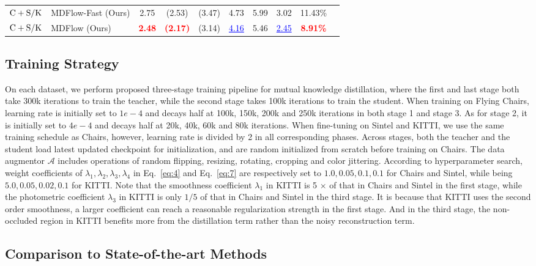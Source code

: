 \documentclass[lettersize,journal]{IEEEtran}
\begin{document}
\begin{table*}[t]
\begin{tabular}{llcccccccc}
		$\rm C+S/K$ & MDFlow-Fast (Ours) & 2.75 & (2.53) & (3.47) & 4.73 & 5.99 & 3.02 & 11.43\% \\
		$\rm C+S/K$ & MDFlow (Ours) & \textcolor{red}{\textbf{2.48}} & \textcolor{red}{\textbf{(2.17)}} & (3.14) & \textcolor{blue}{\underline{4.16}} & 5.46 & \textcolor{blue}{\underline{2.45}} & \textcolor{red}{\textbf{8.91\%}} \\
		\bottomrule
	\end{tabular}
\end{table*}

\subsection{Training Strategy} \label{Training Strategy}
On each dataset, we perform proposed three-stage training pipeline for mutual knowledge distillation, where the first and last stage both take 300k iterations to train the teacher, while the second stage takes 100k iterations to train the student. When training on Flying Chairs, learning rate is initially set to $1e-4$ and decays half at 100k, 150k, 200k and 250k iterations in both stage 1 and stage 3. As for stage 2, it is initially set to $4e-4$ and decays half at 20k, 40k, 60k and 80k iterations. When fine-tuning on Sintel and KITTI, we use the same training schedule as Chairs, however, learning rate is divided by 2 in all corresponding phases. Across stages, both the teacher and the student load latest updated checkpoint for initialization, and are random initialized from scratch before training on Chairs. The data augmentor $\mathcal{A}$ includes operations of random flipping, resizing, rotating, cropping and color jittering. According to hyperparameter search, weight coefficients of $\lambda_1, \lambda_2, \lambda_3, \lambda_4$ in Eq.~\ref{eq:4} and Eq.~\ref{eq:7} are respectively set to $1.0, 0.05, 0.1, 0.1$ for Chairs and Sintel, while being $5.0, 0.05, 0.02, 0.1$ for KITTI. Note that the smoothness coefficient $\lambda_1$ in KITTI is 5 $\times$ of that in Chairs and Sintel in the first stage, while the photometric coefficient $\lambda_3$ in KITTI is only $1/5$ of that in Chairs and Sintel in the third stage. It is because that KITTI uses the second order smoothness, a larger coefficient can reach a reasonable regularization strength in the first stage. And in the third stage, the non-occluded region in KITTI benefits more from the distillation term rather than the noisy reconstruction term.

\subsection{Comparison to State-of-the-art Methods}
\end{document}
